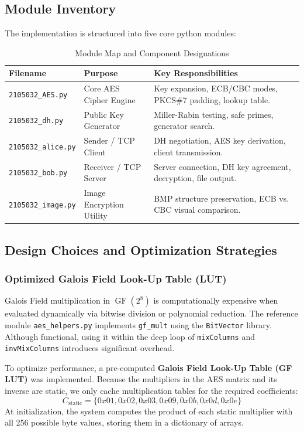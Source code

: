 \documentclass[11pt,a4paper]{article}
\DeclareMathOperator{\GF}{GF}
\begin{document}
\subsection{Module Inventory}
The implementation is structured into five core python modules:
\begin{table}[H]
    \centering
    \caption{Module Map and Component Designations}
    \begin{tabularx}{\textwidth}{l l L}
        \toprule
        \textbf{Filename} & \textbf{Purpose} & \textbf{Key Responsibilities} \\
        \midrule
        \texttt{2105032\_AES.py} & Core AES Cipher Engine & Key expansion, ECB/CBC modes, PKCS\#7 padding, lookup table. \\
        \texttt{2105032\_dh.py} & Public Key Generator & Miller-Rabin testing, safe primes, generator search. \\
        \texttt{2105032\_alice.py} & Sender / TCP Client & DH negotiation, AES key derivation, client transmission. \\
        \texttt{2105032\_bob.py} & Receiver / TCP Server & Server connection, DH key agreement, decryption, file output. \\
        \texttt{2105032\_image.py} & Image Encryption Utility & BMP structure preservation, ECB vs. CBC visual comparison. \\
        \bottomrule
    \end{tabularx}
\end{table}

\subsection{Design Choices and Optimization Strategies}

\subsubsection{Optimized Galois Field Look-Up Table (LUT)}
Galois Field multiplication in $\GF(2^8)$ is computationally expensive when evaluated dynamically via bitwise division or polynomial reduction. The reference module \texttt{aes\_helpers.py} implements \texttt{gf\_mult} using the \texttt{BitVector} library. Although functional, using it within the deep loop of \texttt{mixColumns} and \texttt{invMixColumns} introduces significant overhead.

To optimize performance, a pre-computed \textbf{Galois Field Look-Up Table (GF LUT)} was implemented. Because the multipliers in the AES matrix and its inverse are static, we only cache multiplication tables for the required coefficients:
\begin{equation}
    C_{\text{static}} = \{0x01, 0x02, 0x03, 0x09, 0x0b, 0x0d, 0x0e\}
\end{equation}
At initialization, the system computes the product of each static multiplier with all 256 possible byte values, storing them in a dictionary of arrays.
\end{document}
